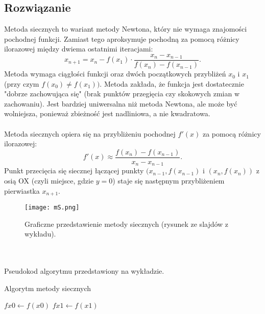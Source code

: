\documentclass{article}
\begin{document}
\subsection{Rozwiązanie}
Metoda siecznych to wariant metody Newtona, który nie wymaga znajomości pochodnej funkcji. Zamiast tego aproksymuje pochodną za pomocą różnicy ilorazowej między dwiema ostatnimi iteracjami:
\[x_{n+1} = x_n - f(x_1) \cdot \frac{x_n - x_{n-1}}{f(x_n)-f(x_{n-1})}.\]
Metoda wymaga ciągłości funkcji oraz dwóch początkowych przybliżeń $x_0$ i $x_1$ (przy czym $f(x_0) \neq f(x_1))$. Metoda zakłada, że funkcja jest dostatecznie "dobrze zachowująca się" (brak punktów przegięcia czy skokowych zmian w zachowaniu). Jest bardziej uniwersalna niż metoda Newtona, ale może być wolniejsza, ponieważ zbieżność jest nadliniowa, a nie kwadratowa.
\\ \\ Metoda siecznych opiera się na przybliżeniu pochodnej $f'(x)$ za pomocą różnicy ilorazowej:
\[f'(x) \approx  \frac{f(x_n)-f(x_{n-1})}{x_n - x_{n-1}}.\] Punkt przecięcia się siecznej łączącej punkty $(x_{n-1}, f(x_{n-1})$ i $(x_{n}, f(x_{n}))$ z osią OX (czyli miejsce, gdzie $y = 0$) staje się następnym przybliżeniem pierwiastka $x_{n+1}$. 
\begin{figure}[H]
    \centering
    \begin{minipage}{0.6\textwidth}
    \texttt{[image: mS.png]}
    \caption{Graficzne przedstawienie metody siecznych (rysunek ze slajdów z wykładu).}
    \end{minipage}
\end{figure}
\\ \\ Pseudokod algorytmu przedstawiony na wykładzie. \\
\begin{algorithm}[H]
\caption{Algorytm metody siecznych}
$fx0 \gets f(x0)$\;
$fx1 \gets f(x1)$\;
\;
\end{algorithm}
\end{document}
